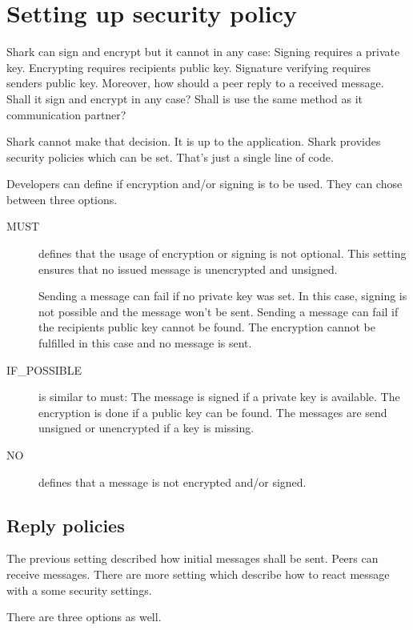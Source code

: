 \section{Setting up security policy}
Shark can sign and encrypt but it cannot in any case: Signing requires a private key. Encrypting requires recipients public key. Signature verifying requires senders public key. Moreover, how should a peer reply to a received message. Shall it sign and encrypt in any case? Shall is use the same method as it communication partner? 

Shark cannot make that decision. It is up to the application. Shark provides security policies which can be set. That's just a single line of code.

Developers can define if encryption and/or signing is to be used. They can chose between three options.
\begin{description}
    \item[MUST] defines that the usage of encryption or signing is not optional. This setting ensures that no issued message is unencrypted and unsigned. 

Sending a message can fail if no private key was set. In this case, signing is not possible and the message won't be sent. Sending a message can fail if the recipients public key cannot be found. The encryption cannot be fulfilled in this case and no message is sent.

    \item[IF\_POSSIBLE] is similar to must: The message is signed if a private key is available. The encryption is done if a public key can be found. The messages are send unsigned or unencrypted if a key is missing.

    \item[NO] defines that a message is not encrypted and/or signed.
\end{description}

\subsection{Reply policies}
The previous setting described how initial messages shall be sent. Peers can receive messages. There are more setting which describe how to react message with a some security settings.

There are three options as well.

